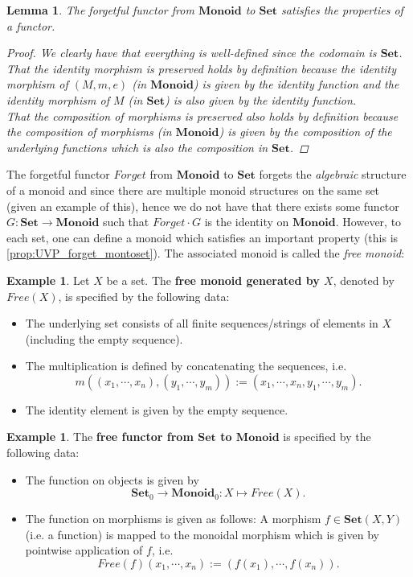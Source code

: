 \documentclass[a4paper,10pt]{scrartcl}
\theoremstyle{plain}
\newtheorem{lemma}[thm]{Lemma}
\theoremstyle{definition}
\newtheorem{exa}[thm]{Example}
\newcommand{\Catb}[1]{\mathbf{#1}}
\newcommand{\SET}{\Catb{Set}}
\newcommand{\MON}{\Catb{Monoid}}
\newcommand{\Ob}[1]{{#1}_0}
\newcommand{\CHom}[3]{{#1}(#2,#3)}
\newcommand{\Comp}{\cdot}
\begin{document}
\begin{lemma} The forgetful functor from $\MON$ to $\SET$ satisfies the properties of a functor.
\begin{proof}
We clearly have that everything is well-defined since the codomain is $\SET$.\\
That the identity morphism is preserved holds by definition because the identity morphism of $(M,m,e)$ (in $\MON$) is given by the identity function and the identity morphism of $M$ (in $\SET$) is also given by the identity function.\\
That the composition of morphisms is preserved also holds by definition because the composition of morphisms (in $\MON$) is given by the composition of the underlying functions which is also the composition in $\SET$.
\end{proof}
\end{lemma}

The forgetful functor $Forget$ from $\MON$ to $\SET$ forgets the \textit{algebraic} structure of a monoid and since there are multiple monoid structures on the same set (given an example of this), hence we do not have that there exists some functor $G: \SET\to \MON$ such that $Forget\Comp G$ is the identity on $\MON$. However, to each set, one can define a monoid which satisfies an important property (this is \cref{prop:UVP_forget_montoset}). The associated monoid is called the \textit{free monoid}:
\begin{exa} Let $X$ be a set. The \textbf{free monoid generated by $X$}, denoted by $Free(X)$, is specified by the following data:
\begin{itemize}
\item The underlying set consists of all finite sequences/strings of elements in $X$ (including the empty sequence).
\item The multiplication is defined by concatenating the sequences, i.e. 
$$m\left((x_1,\cdots,x_n),(y_1,\cdots,y_m)\right) := (x_1,\cdots,x_n,y_1,\cdots,y_m).$$
\item The identity element is given by the empty sequence.
\end{itemize}
\end{exa}

\begin{exa}\label{exa:freemonoids} The \textbf{free functor from $\SET$ to $\MON$} is specified by the following data:
\begin{itemize}
\item The function on objects is given by 
\[
\Ob{\SET}\to \Ob{\MON}: X\mapsto Free(X).
\]
\item The function on morphisms is given as follows: A morphism $f \in \CHom{\SET}{X}{Y}$ (i.e. a function) is mapped to the monoidal morphism which is given by pointwise application of $f$, i.e.
\[
Free(f)(x_1,\cdots,x_n) := (f(x_1),\cdots, f(x_n)).
\]
\end{itemize}
\end{exa}
\end{document}
